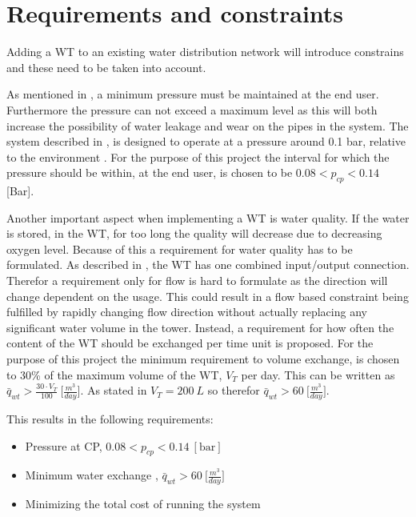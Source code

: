 \chapter{Requirements and constraints}
\label{Requirements_and_constraints}

Adding a WT to an existing water distribution network will introduce constrains and these need to be taken into account. 

As mentioned in , a minimum pressure must be maintained at the end user. Furthermore the pressure can not exceed a maximum level as this will both increase the possibility of water leakage and wear on the pipes in the system. The system described in , is designed to operate at a pressure around 0.1 bar, relative to the environment \cite{master_aau}. For the purpose of this project the interval for which the pressure should be within, at the end user, is chosen to be $0.08 < p_{cp} < 0.14$ [Bar].

Another important aspect when implementing a WT is water quality. If the water is stored, in the WT, for too long the quality will decrease due to decreasing oxygen level. Because of this a requirement for water quality has to be formulated. As described in , the WT has one combined input/output connection. Therefor a requirement only for flow is hard to formulate as the direction will change dependent on the usage. This could result in a flow based constraint being fulfilled by rapidly changing flow direction without actually replacing any significant water volume in the tower. Instead, a requirement for how often the content of the WT should be exchanged per time unit is proposed. For the purpose of this project the minimum requirement to volume exchange, is chosen to 30\% of the maximum volume of the WT, $V_T$ per day. This can be written as $\bar{q}_{wt} > \frac{30\cdot V_T}{100} \: \big[\frac{m^3}{day}\big]$. As stated in  $V_T = 200 \:L$ so therefor $\bar{q}_{wt} > 60 \: \big[\frac{m^3}{day}\big]$.

This results in the following requirements:

\begin{itemize}
	\item Pressure at CP, $0.08 < p_{cp} < 0.14 \:[\text{bar}]$
%
	\item Minimum water exchange , $\bar{q}_{wt} > 60 \: \big[\frac{m^3}{day}\big]$
%
	\item Minimizing the total cost of running the system
\end{itemize}